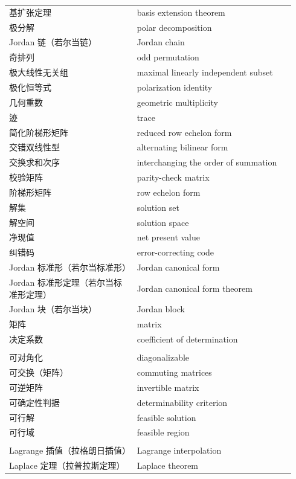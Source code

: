 {\begin{longtable}{p{0.42\linewidth}p{0.52\linewidth}}
		基扩张定理 & basis extension theorem \\
		极分解 & polar decomposition \\
		Jordan 链（若尔当链） & Jordan chain \\
		奇排列 & odd permutation \\
		极大线性无关组 & maximal linearly independent subset \\
		极化恒等式 & polarization identity \\
		几何重数 & geometric multiplicity \\
		迹 & trace \\
		简化阶梯形矩阵 & reduced row echelon form \\
		交错双线性型 & alternating bilinear form \\
		交换求和次序 & interchanging the order of summation \\
		校验矩阵 & parity-check matrix \\
		阶梯形矩阵 & row echelon form \\
		解集 & solution set \\
		解空间 & solution space \\
		净现值 & net present value \\
		纠错码 & error-correcting code \\
		Jordan 标准形（若尔当标准形） & Jordan canonical form \\
		Jordan 标准形定理（若尔当标准形定理） & Jordan canonical form theorem \\
		Jordan 块（若尔当块） & Jordan block \\
		矩阵 & matrix \\
		决定系数 & coefficient of determination \\
		\addlinespace
		\multicolumn{2}{l}{\textbf{\sffamily K}} \\
		可对角化 & diagonalizable \\
		可交换（矩阵） & commuting matrices \\
		可逆矩阵 & invertible matrix \\
		可确定性判据 & determinability criterion \\
		可行解 & feasible solution \\
		可行域 & feasible region \\
		\addlinespace
		\multicolumn{2}{l}{\textbf{\sffamily L}} \\
		Lagrange 插值（拉格朗日插值） & Lagrange interpolation \\
		Laplace 定理（拉普拉斯定理） & Laplace theorem \\

\end{longtable}}
